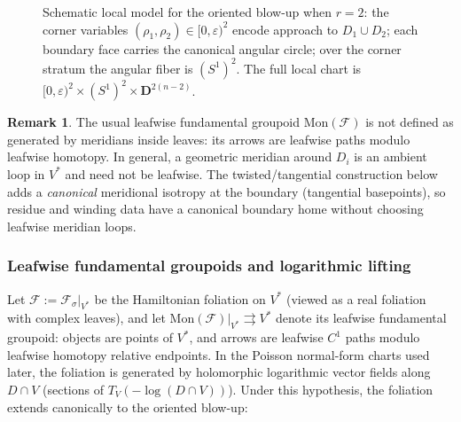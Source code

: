 \documentclass[11pt]{amsart}
\theoremstyle{plain}
\theoremstyle{definition}
\newtheorem{remark}[theorem]{Remark}
\newcommand{\Mon}{\mathrm{Mon}}
\newcommand{\fol}{\mathcal{F}}
\theoremstyle{definition}
\begin{document}
\begin{figure}[t]
\caption{Schematic local model for the oriented blow-up when $r=2$: the corner variables $(\rho_1,\rho_2)\in[0,\varepsilon)^2$ encode approach to $D_1\cup D_2$; each boundary face carries the canonical angular circle; over the corner stratum the angular fiber is $(S^1)^2$. The full local chart is $[0,\varepsilon)^2\times (S^1)^2\times \mathbf D^{2(n-2)}$.}
\label{fig:corners}
\end{figure}

\begin{remark}\label{rem:not-generated}
The usual leafwise fundamental groupoid $\Mon(\fol)$ is not defined as generated by meridians inside leaves:
its arrows are leafwise paths modulo leafwise homotopy. In general, a geometric meridian around $D_i$ is an ambient
loop in $V^*$ and need not be leafwise. The twisted/tangential construction below adds a \emph{canonical} meridional
isotropy at the boundary (tangential basepoints), so residue and winding data have a canonical boundary home without
choosing leafwise meridian loops.
\end{remark}

\subsubsection*{ Leafwise fundamental groupoids and logarithmic lifting}

Let $\fol:=\fol_\sigma|_{V^*}$ be the Hamiltonian foliation on $V^*$ (viewed as a real foliation with complex leaves),
and let $\Mon(\fol)|_{V^*}\rightrightarrows V^*$ denote its leafwise fundamental groupoid: objects are points of $V^*$,
and arrows are leafwise $C^1$ paths modulo leafwise homotopy relative endpoints.
In the Poisson normal-form charts used later, the foliation is generated by holomorphic logarithmic vector fields
along $D\cap V$ (sections of $T_V(-\log(D\cap V))$). Under this hypothesis, the foliation extends canonically to the
oriented blow-up:
\end{document}
